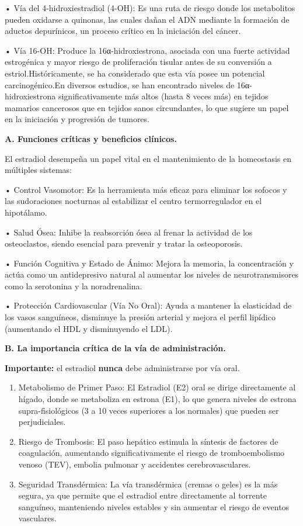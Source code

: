 \documentclass[
  spanish,
]{article}
\begin{document}
• Vía del 4-hidroxiestradiol (4-OH): Es una ruta de riesgo donde los metabolitos pueden oxidarse a quinonas, las cuales dañan el ADN mediante la formación de aductos depurínicos, un proceso crítico en la iniciación del cáncer.

• Vía 16-OH: Produce la 16α-hidroxiestrona, asociada con una fuerte actividad estrogénica y mayor riesgo de proliferación tisular antes de su conversión a estriol.Históricamente, se ha considerado que esta vía posee un potencial carcinogénico.En diversos estudios, se han encontrado niveles de 16α-hidroxiestrona significativamente más altos (hasta 8 veces más) en tejidos mamarios cancerosos que en tejidos sanos circundantes, lo que sugiere un papel en la iniciación y progresión de tumores.

\textbf{A. Funciones críticas y beneficios clínicos.}

El estradiol desempeña un papel vital en el mantenimiento de la homeostasis en múltiples sistemas:

• Control Vasomotor: Es la herramienta más eficaz para eliminar los sofocos y las sudoraciones nocturnas al estabilizar el centro termorregulador en el hipotálamo.

• Salud Ósea: Inhibe la reabsorción ósea al frenar la actividad de los osteoclastos, siendo esencial para prevenir y tratar la osteoporosis.

• Función Cognitiva y Estado de Ánimo: Mejora la memoria, la concentración y actúa como un antidepresivo natural al aumentar los niveles de neurotransmisores como la serotonina y la noradrenalina.

• Protección Cardiovascular (Vía No Oral): Ayuda a mantener la elasticidad de los vasos sanguíneos, disminuye la presión arterial y mejora el perfil lipídico (aumentando el HDL y disminuyendo el LDL).

\textbf{B. La importancia crítica de la vía de administración.}

\textbf{Importante:} el estradiol \textbf{nunca} debe administrarse por vía oral.

\begin{enumerate}
\def\labelenumi{\arabic{enumi}.}
\item
  Metabolismo de Primer Paso: El Estradiol (E2) oral se dirige directamente al hígado, donde se metaboliza en estrona (E1), lo que genera niveles de estrona supra-fisiológicos (3 a 10 veces superiores a los normales) que pueden ser perjudiciales.
\item
  Riesgo de Trombosis: El paso hepático estimula la síntesis de factores de coagulación, aumentando significativamente el riesgo de tromboembolismo venoso (TEV), embolia pulmonar y accidentes cerebrovasculares.
\item
  Seguridad Transdérmica: La vía transdérmica (cremas o geles) es la más segura, ya que permite que el estradiol entre directamente al torrente sanguíneo, manteniendo niveles estables y sin aumentar el riesgo de eventos vasculares.
\end{enumerate}
\end{document}
